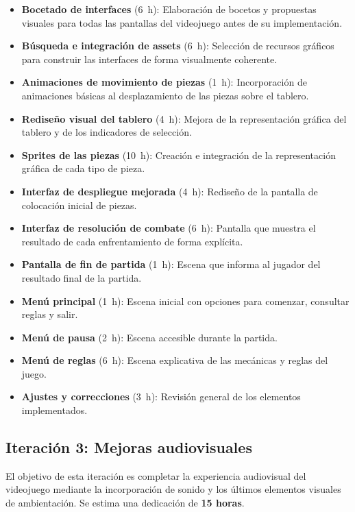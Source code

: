 \begin{itemize}
	\item \textbf{Bocetado de interfaces} (6~h): Elaboración de bocetos y propuestas visuales para todas las pantallas del videojuego antes de su implementación.
	\item \textbf{Búsqueda e integración de assets} (6~h): Selección de recursos gráficos para construir las interfaces de forma visualmente coherente.
	\item \textbf{Animaciones de movimiento de piezas} (1~h): Incorporación de animaciones básicas al desplazamiento de las piezas sobre el tablero.
	\item \textbf{Rediseño visual del tablero} (4~h): Mejora de la representación gráfica del tablero y de los indicadores de selección.
	\item \textbf{Sprites de las piezas} (10~h): Creación e integración de la representación gráfica de cada tipo de pieza.
	\item \textbf{Interfaz de despliegue mejorada} (4~h): Rediseño de la pantalla de colocación inicial de piezas.
	\item \textbf{Interfaz de resolución de combate} (6~h): Pantalla que muestra el resultado de cada enfrentamiento de forma explícita.
	\item \textbf{Pantalla de fin de partida} (1~h): Escena que informa al jugador del resultado final de la partida.
	\item \textbf{Menú principal} (1~h): Escena inicial con opciones para comenzar, consultar reglas y salir.
	\item \textbf{Menú de pausa} (2~h): Escena accesible durante la partida.
	\item \textbf{Menú de reglas} (6~h): Escena explicativa de las mecánicas y reglas del juego.
	\item \textbf{Ajustes y correcciones} (3~h): Revisión general de los elementos implementados.
\end{itemize}

\subsection{Iteración 3: Mejoras audiovisuales}

El objetivo de esta iteración es completar la experiencia audiovisual del videojuego mediante la incorporación de sonido y los últimos elementos visuales de ambientación. Se estima una dedicación de \textbf{15 horas}.

